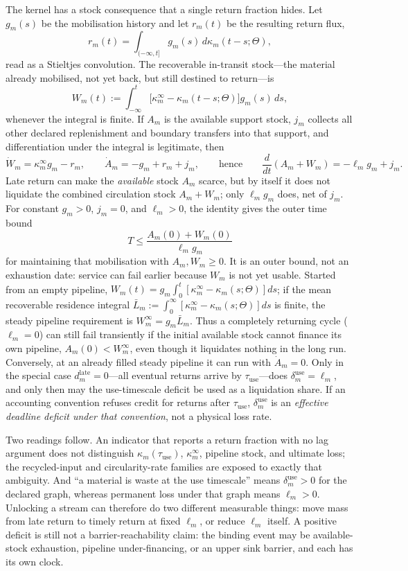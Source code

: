 \documentclass[11pt]{article}
\begin{document}
The kernel has a stock consequence that a single return fraction hides. Let \(g_m(s)\) be the mobilisation history and let \(r_m(t)\) be the resulting return flux,
$$r_m(t)=\int_{(-\infty,t]} g_m(s)\,d\kappa_m(t-s;\Theta),$$
read as a Stieltjes convolution. The recoverable in-transit stock---the material already mobilised, not yet back, but still destined to return---is
$$W_m(t):=\int_{-\infty}^{t}\bigl[\kappa_m^\infty-\kappa_m(t-s;\Theta)\bigr]g_m(s)\,ds,$$
whenever the integral is finite. If \(A_m\) is the available support stock, \(j_m\) collects all other declared replenishment and boundary transfers into that support, and differentiation under the integral is legitimate, then
$$\dot W_m=\kappa_m^\infty g_m-r_m,\qquad \dot A_m=-g_m+r_m+j_m,\qquad\text{hence}\qquad \frac{d}{dt}(A_m+W_m)=-\ell_mg_m+j_m.$$
Late return can make the \emph{available} stock \(A_m\) scarce, but by itself it does not liquidate the combined circulation stock \(A_m+W_m\); only \(\ell_mg_m\) does, net of \(j_m\). For constant \(g_m>0\), \(j_m=0\), and \(\ell_m>0\), the identity gives the outer time bound
$$T\le \frac{A_m(0)+W_m(0)}{\ell_mg_m}$$
for maintaining that mobilisation with \(A_m,W_m\ge0\). It is an outer bound, not an exhaustion date: service can fail earlier because \(W_m\) is not yet usable. Started from an empty pipeline, \(W_m(t)=g_m\int_0^t[\kappa_m^\infty-\kappa_m(s;\Theta)]ds\); if the mean recoverable residence integral \(\bar L_m:=\int_0^\infty[\kappa_m^\infty-\kappa_m(s;\Theta)]ds\) is finite, the steady pipeline requirement is \(W_m^\infty=g_m\bar L_m\). Thus a completely returning cycle (\(\ell_m=0\)) can still fail transiently if the initial available stock cannot finance its own pipeline, \(A_m(0)<W_m^\infty\), even though it liquidates nothing in the long run. Conversely, at an already filled steady pipeline it can run with \(\dot A_m=0\). Only in the special case \(d_m^{\mathrm{late}}=0\)---all eventual returns arrive by \(\tau_{\mathrm{use}}\)---does \(\delta_m^{\mathrm{use}}=\ell_m\), and only then may the use-timescale deficit be used as a liquidation share. If an accounting convention refuses credit for returns after \(\tau_{\mathrm{use}}\), \(\delta_m^{\mathrm{use}}\) is an \emph{effective deadline deficit under that convention}, not a physical loss rate.

Two readings follow. An indicator that reports a return fraction with no lag argument does not distinguish \(\kappa_m(\tau_{\mathrm{use}})\), \(\kappa_m^\infty\), pipeline stock, and ultimate loss; the recycled-input and circularity-rate families are exposed to exactly that ambiguity. And ``a material is waste at the use timescale'' means \(\delta_m^{\mathrm{use}}>0\) for the declared graph, whereas permanent loss under that graph means \(\ell_m>0\). Unlocking a stream can therefore do two different measurable things: move mass from late return to timely return at fixed \(\ell_m\), or reduce \(\ell_m\) itself. A positive deficit is still not a barrier-reachability claim: the binding event may be available-stock exhaustion, pipeline under-financing, or an upper sink barrier, and each has its own clock.
\end{document}
